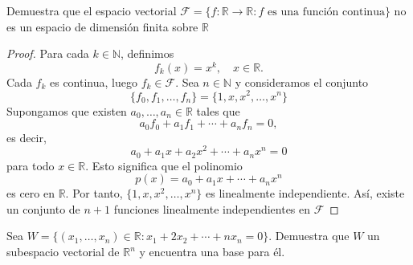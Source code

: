 \documentclass[12pt,a4paper]{article}
\begin{document}
    \begin{mdframed}[style=mdbluebox,frametitle={Ejercicio 6}]
        Demuestra que el espacio vectorial $\mathcal{F}=\{f:\mathbb{R}\to\mathbb{R}: f\text{ es una función continua}\}$ no es un
        espacio de dimensión finita sobre $\mathbb{R}$
    \end{mdframed}

    \begin{proof}
        Para cada $k\in\mathbb{N}$, definimos
        \begin{equation*}
            f_{k}(x)=x^{k},\quad x\in\mathbb{R}.
        \end{equation*}
        Cada $f_{k}$ es continua, luego $f_{k}\in\mathcal{F}$. Sea $n\in\mathbb{N}$ y
        consideramos el conjunto
        \begin{equation*}
            \{f_{0},f_{1},\dots,f_{n}\}=\{1,x,x^{2},\dots,x^{n}\}
        \end{equation*}
        Supongamos que existen $a_{0},\dots,a_{n}\in\mathbb{R}$ tales que
        \begin{equation*}
            a_{0}f_{0}+a_{1}f_{1}+\cdots+a_{n}f_{n}=0,
        \end{equation*}
        es decir,
        \begin{equation*}
            a_{0}+a_{1}x+a_{2}x^{2}+\cdots+a_{n}x^{n}=0
        \end{equation*}
        para todo $x\in\mathbb{R}$. Esto significa que el polinomio
        \begin{equation*}
            p(x)=a_{0}+a_{1}x+\cdots+a_{n}x^{n}
        \end{equation*}
        es cero en $\mathbb{R}$. Por tanto, $\{1,x,x^{2},\dots,x^{n}\}$ es linealmente independiente.
        Así, existe un conjunto de $n+1$ funciones linealmente independientes en $\mathcal{F}$
    \end{proof}

    \begin{mdframed}[style=mdbluebox,frametitle={Ejercicio 7}]
        Sea $W=\{(x_{1},\dots,x_{n})\in\mathbb{R}:x_{1}+2x_{2}+\cdots+nx_{n}=0\}$. Demuestra que $W$ un subespacio
        vectorial de $\mathbb{R}^{n}$ y encuentra una base para él. 
    \end{mdframed}
\end{document}
